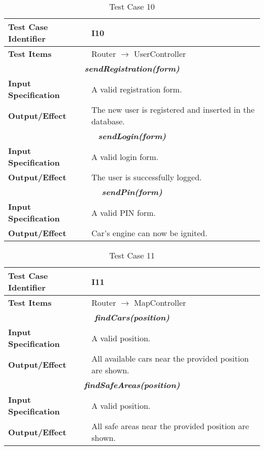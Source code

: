 \begin{table}[h]
	\begin{tabularx}{\textwidth}{l X}
		\hline
		\textbf{Test Case Identifier}	&	I10\\	\hline
		\textbf{Test Items}			&	Router $\rightarrow$ UserController \\	\hline\hline
		\multicolumn{2}{c}{\textbf{\textit{sendRegistration(form)}}}	\\	\hline
			\textbf{Input Specification}	&	A valid registration form.\\	\hline
			\textbf{Output/Effect}	&	The new user is registered and inserted in the database.\\	\hline\hline
		\multicolumn{2}{c}{\textbf{\textit{sendLogin(form)}}}	\\	\hline
			\textbf{Input Specification}	&	A valid login form.\\	\hline
			\textbf{Output/Effect}	&	The user is successfully logged.\\	\hline\hline
		\multicolumn{2}{c}{\textbf{\textit{sendPin(form)}}}	\\	\hline
			\textbf{Input Specification}	&	A valid PIN form.\\	\hline
			\textbf{Output/Effect}	&	Car's engine can now be ignited.\\	\hline\hline
	\end{tabularx}
	\captionsetup{textformat=empty,labelformat=blank}
	\caption{Test Case 10}
	\label{table:template-table-10}
\end{table}

\begin{table}[h]
	\begin{tabularx}{\textwidth}{l X}
		\hline
		\textbf{Test Case Identifier}	&	I11\\	\hline
		\textbf{Test Items}			&	Router $\rightarrow$ MapController \\	\hline\hline
		\multicolumn{2}{c}{\textbf{\textit{findCars(position)}}}	\\	\hline
			\textbf{Input Specification}	&	A valid position.\\	\hline
			\textbf{Output/Effect}	&	All available cars near the provided position are shown.\\	\hline\hline
		\multicolumn{2}{c}{\textbf{\textit{findSafeAreas(position)}}}	\\	\hline
			\textbf{Input Specification}	&	A valid position.\\	\hline
			\textbf{Output/Effect}	&	All safe areas near the provided position are shown.\\	\hline\hline
	\end{tabularx}
	\captionsetup{textformat=empty,labelformat=blank}
	\caption{Test Case 11}
	\label{table:template-table-11}
\end{table}

